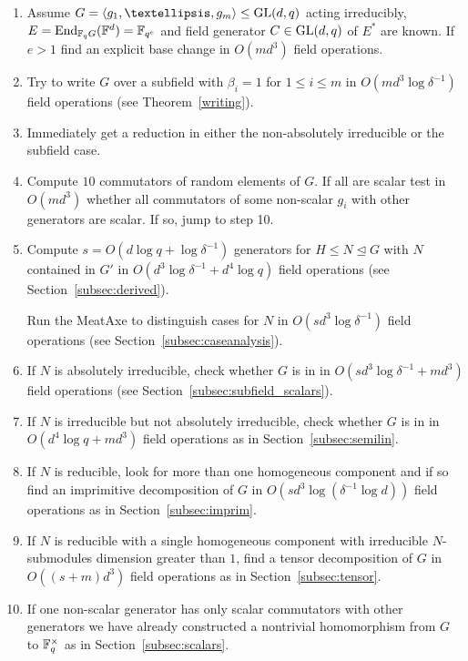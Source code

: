 \begin{enumerate}
\item Assume $G = \left< g_1, \ldots, g_m \right> \le \GL(d,q)$ acting
irreducibly, $E = \End_{\F_q G}(\F^d) = \F_{q^e}$ and
field generator $C \in \GL(d,q)$ of $E^\ast$ are known. If $e > 1$ find an explicit
base change in $O(md^3)$ field operations.
\item Try to write $G$ over a subfield with $\beta_i = 1$ for $1 \leq i \leq m$ 
in $O(md^3\log \delta^{-1})$ field operations
(see Theorem~\ref{writing}).
\item Immediately get a reduction in either the non-absolutely irreducible
or the subfield case.
\item Compute $10$ commutators of random elements of $G$. If all are scalar test in $O(md^3)$ whether all commutators of some non-scalar $g_i$ with other generators are scalar. If so, jump to step 10. 
\item Compute $s = O(d\log q + \log \delta^{-1})$ generators for 
    $H \le N \unlhd G$ with $N$ contained in $G'$ in 
    $O(d^3\log \delta^{-1} + d^4 \log q)$ field operations
    (see Section~\ref{subsec:derived}). 

Run the MeatAxe to distinguish cases for $N$ in 
$O(sd^3 \log \delta^{-1})$ field operations
(see Section~\ref{subsec:caseanalysis}).
\item If $N$ is absolutely irreducible, check whether $G$ is in 
in $O(sd^3\log \delta^{-1} + md^3)$ field operations
(see Section~\ref{subsec:subfield_scalars}).
\item If $N$ is irreducible but not absolutely irreducible, check
whether $G$ is in  in $O(d^4\log q +m d^3)$ field operations
    as in Section~\ref{subsec:semilin}.
\item If $N$ is reducible, look for more than one 
homogeneous component and if so find an imprimitive 
decomposition of $G$ in $O(sd^3\log( \delta^{-1} \log d))$ field operations as in
Section~\ref{subsec:imprim}.
\item If $N$ is reducible with a single 
homogeneous component with irreducible $N$-submodules 
dimension greater than $1$, find a tensor
decomposition of $G$ in $O((s+m)d^3)$ field operations as in 
Section~\ref{subsec:tensor}.
\item If one non-scalar 
generator has only scalar commutators with other generators we have 
already constructed
a nontrivial homomorphism from $G$ to $\mathbb{F}_q^\times$
 as in
Section~\ref{subsec:scalars}.
\end{enumerate}

